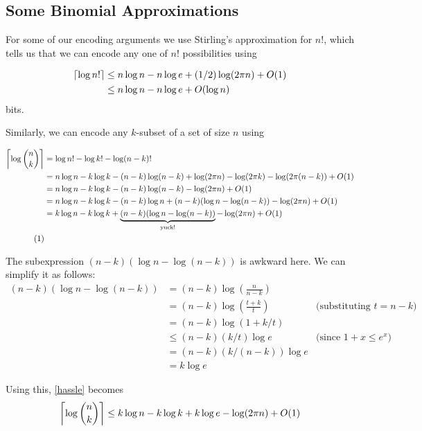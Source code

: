 \documentclass[lotsofwhite]{patmorin}
\newcommand\numberthis{\addtocounter{equation}{1}\tag{\theequation}}
\begin{document}
\subsection{Some Binomial Approximations}

For some of our encoding arguments we use Stirling's approximation for $n!$, 
which tells us that we can encode any one of $n!$ possibilities using

\begin{align}
  \lceil \log n!\rceil 
      & \le n\log n - n\log e + (1/2)\log(2\pi n) + O(1)  
             \eqlabel{stirling-tight} \\
      & \le n\log n - n\log e + O(\log n)  
             \eqlabel{stirling-loose}
\end{align}
bits.

Similarly, we can encode any $k$-subset of a set of size $n$ using

\begin{align*}
  \left\lceil\log \binom{n}{k}\right\rceil 
     & = \log n! - \log k! - \log (n-k)! \\
     & = n\log n - k\log k - (n-k)\log(n-k) + \log(2\pi n) - \log (2\pi k) - \log (2\pi (n-k)) + O(1) \\
     & = n\log n - k\log k - (n-k)\log(n-k) - \log(2\pi n) + O(1)  \\
     & = n\log n - k\log k - (n-k)\log n + (n-k)(\log n-\log(n-k)) - \log(2\pi n) + O(1) \\
     & = k\log n - k\log k + \underbrace{(n-k)(\log n-\log(n-k))}_\text{yuck!}  - \log(2\pi n) + O(1) \\
         \numberthis \eqlabel{hassle} \\ 
\end{align*}

The subexpression $(n-k)(\log n-\log(n-k))$ is awkward here. We can
simplify it as follows:
\begin{align*}
   (n-k)(\log n-\log(n-k))
      & = (n-k)\log \left(\frac{n}{n-k}\right) \\
      & = (n-k)\log\left(\frac{t+k}{t}\right) & \text{(substituting $t=n-k$)} \\
      & = (n-k)\log(1+k/t) \\
      & \le (n-k)(k/t)\log e & \text{(since $1+x \le e^x$)} \\
      & = (n-k)(k/(n-k))\log e \\
      & = k\log e 
\end{align*}

Using this, \eqref{hassle} becomes
\begin{equation}
  \left\lceil\log \binom{n}{k}\right\rceil 
    \le k\log n - k\log k + k\log e - \log (2\pi n) + O(1) \eqlabel{log-n-choose-k}
\end{equation} 
\end{document}
